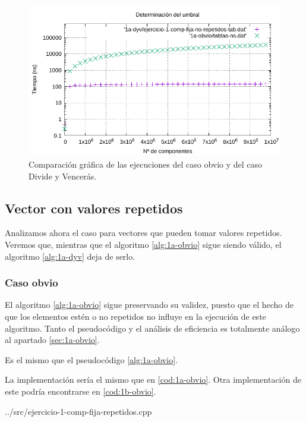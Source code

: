 \begin{figure}[h]
	\centering
	\includegraphics[scale=0.87]{img/e1a-comp.pdf}
	\caption{Comparación gráfica de las ejecuciones del caso obvio y del caso Divide y Vencerás.}
	\label{fig:1a-comp-datos}
\end{figure}

\subsection{Vector con valores repetidos}

Analizamos ahora el caso para vectores que pueden tomar valores repetidos. Veremos que, mientras que el algoritmo
\ref{alg:1a-obvio} sigue siendo válido, el algoritmo \ref{alg:1a-dyv} deja de serlo. 

\subsubsection{Caso obvio}

El algoritmo \ref{alg:1a-obvio} sigue preservando su validez, puesto que el hecho de que los elementos estén o no
repetidos no influye en la ejecución de este algoritmo. Tanto el pseudocódigo y el análisis de eficiencia es totalmente
análogo al apartado \ref{sec:1a-obvio}. 


Es el mismo que el pseudocódigo \ref{alg:1a-obvio}. 


La implementación sería el mismo que en \ref{cod:1a-obvio}. Otra implementación de este podría encontrarse en \ref{cod:1b-obvio}. 


{../src/ejercicio-1-comp-fija-repetidos.cpp} 

